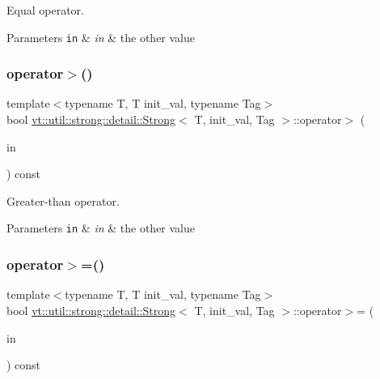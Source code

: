 Equal operator. 


\begin{DoxyParams}[1]{Parameters}
\mbox{\tt in}  & {\em in} & the other value \\
\hline
\end{DoxyParams}
\mbox{\label{structvt_1_1util_1_1strong_1_1detail_1_1_strong_a56fd64561dfd96f87d9d46a6df44ed04}} 
\subsubsection{\texorpdfstring{operator$>$()}{operator>()}}
{\footnotesize\ttfamily template$<$typename T, T init\+\_\+val, typename Tag$>$ \\
bool \hyperlink{structvt_1_1util_1_1strong_1_1detail_1_1_strong}{vt\+::util\+::strong\+::detail\+::\+Strong}$<$ T, init\+\_\+val, Tag $>$\+::operator$>$ (\begin{DoxyParamCaption}\item[{\hyperlink{structvt_1_1util_1_1strong_1_1detail_1_1_strong_a510d40741bda362d97a4753919a577dd}{This\+Type} const \&}]{in }\end{DoxyParamCaption}) const\hspace{0.3cm}{\ttfamily [inline]}}



Greater-\/than operator. 


\begin{DoxyParams}[1]{Parameters}
\mbox{\tt in}  & {\em in} & the other value \\
\hline
\end{DoxyParams}
\mbox{\label{structvt_1_1util_1_1strong_1_1detail_1_1_strong_a849dd3f84fc0c448715fcda4216a626a}} 
\subsubsection{\texorpdfstring{operator$>$=()}{operator>=()}}
{\footnotesize\ttfamily template$<$typename T, T init\+\_\+val, typename Tag$>$ \\
bool \hyperlink{structvt_1_1util_1_1strong_1_1detail_1_1_strong}{vt\+::util\+::strong\+::detail\+::\+Strong}$<$ T, init\+\_\+val, Tag $>$\+::operator$>$= (\begin{DoxyParamCaption}\item[{\hyperlink{structvt_1_1util_1_1strong_1_1detail_1_1_strong_a510d40741bda362d97a4753919a577dd}{This\+Type} const \&}]{in }\end{DoxyParamCaption}) const\hspace{0.3cm}{\ttfamily [inline]}}



